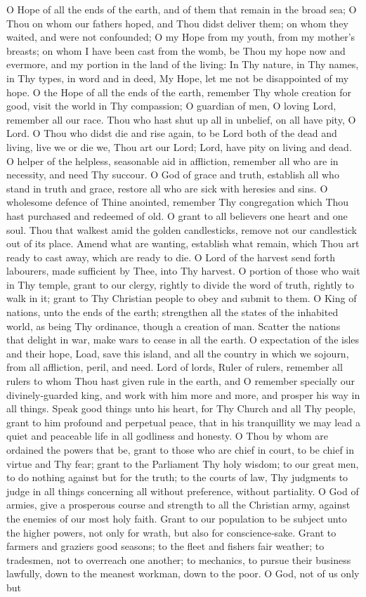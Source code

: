 O Hope of all the ends of the earth, and of them that remain in the broad sea; O Thou on whom our fathers hoped, and Thou didst deliver them; on whom they waited, and were not confounded; O my Hope from my youth, from my mother’s breasts; on whom I have been cast from the womb, be Thou my hope now and evermore, and my portion in the land of the living: In Thy nature, in Thy names, in Thy types,  in word and in deed, My Hope, let me not be disappointed of my hope. O the Hope of all the ends of the earth, remember Thy whole creation for good, visit the world in Thy compassion; O guardian of men, O loving Lord, remember all our race. Thou who hast shut up all in unbelief, on all have pity, O Lord. O Thou who didst die and rise again, to be Lord both of the dead and living, live we or die we, Thou art our Lord; Lord, have pity on living and dead. O helper of the helpless, seasonable aid in affliction, remember all who are in necessity, and need Thy succour. O God of grace and truth, establish all who stand in truth and grace, restore all who are sick with heresies and sins. O wholesome defence of Thine anointed, remember Thy congregation which Thou hast purchased and redeemed of old. O grant to all believers one heart and one soul. Thou that walkest amid the golden candlesticks, remove not our candlestick out of its place. Amend what are wanting, establish what remain, which Thou art ready to cast away, which are ready to die. O Lord of the harvest send forth labourers, made sufficient by Thee, into Thy harvest. O portion of those who wait in Thy temple, grant to our clergy, rightly to divide the word of truth, rightly to walk in it; grant to Thy Christian people to obey and submit to them. O King of nations, unto the ends of the earth; strengthen all the states of the inhabited world, as being Thy ordinance, though a creation of man. Scatter the nations that delight in war, make wars to cease in all the earth. O expectation of the isles and their hope, Load, save this island, and all the country in which we sojourn, from all affliction, peril, and need. Lord of lords, Ruler of rulers, remember all rulers to whom Thou hast given rule in the earth, and O remember specially our divinely‑guarded king, and work with him more and more, and prosper his way in all things. Speak good things unto his heart, for Thy Church and all Thy people, grant to him profound and perpetual peace, that in his tranquillity we may lead a quiet and peaceable life in all godliness and honesty. O Thou by whom are ordained the powers that be, grant to those who are chief in court, to be chief in virtue and Thy fear; grant to the Parliament Thy holy wisdom; to our great men, to do nothing against but for the truth; to the courts of law, Thy judgments to judge in all things concerning all without preference, without partiality. O God of armies, give a prosperous course and strength to all the Christian army, against the enemies of our most holy faith. Grant to our population to be subject unto the higher powers, not only for wrath, but also for conscience‑sake. Grant to farmers and graziers good seasons; to the fleet and fishers fair weather; to tradesmen, not to overreach one another;  to mechanics, to pursue their business lawfully, down to the meanest workman,  down to the poor. O God, not of us only but 